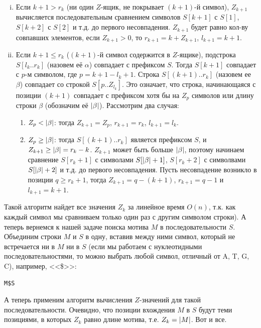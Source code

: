 \documentclass[letterpaper, 11pt]{article}
\DeclarePairedDelimiter{\abs}{\lvert}{\rvert}
\begin{document}
\begin{enumerate}[(i)]
\item
Если $k + 1 > r_k$ (ни один $Z$-ящик, не покрывает $(k+1)$-й символ), $Z_{k+1}$ вычисляется последовательным сравнением символов $S[k+1]$ с $S[1]$, $S[k+2]$ с $S[2]$ и т.д. до первого несовпадения. $Z_{k+1}$ будет равно кол-ву совпавших элементов, если $Z_{k+1} > 0$, то $r_{k+1} = k + Z_{k+1}$, $l_{k+1} = k + 1$.
\item
Если $k + 1 \leq r_k$ ($(k+1)$-й символ содержится в $Z$-ящике), подстрока $S[l_k..r_k]$ (назовем её $\alpha$) совпадает с префиксом $S$. Тогда $S[k+1]$ совпадает с $p$-м символом, где $p = k + 1 - l_k + 1$. Строка $S[(k+1)..r_k]$ (назовем ее $\beta$) совпадает со строкой $S[p..Z_{l_k}]$. Это означает, что строка, начинающаяся с позиции $(k+1)$ совпадает с префиксом хотя бы на $Z_{p}$ символов или длину строки $\beta$ (обозначим её $\abs{\beta}$). Рассмотрим два случая:
\begin{enumerate}
 \item
 $Z_{p} < \abs{\beta}$: тогда $Z_{k+1} = Z_{p}$, $r_{k+1} = r_{k}$, $l_{k+1} = l_k$.
 \item
 $Z_{p} \geq \abs{\beta}$: тогда $S[(k+1)..r_k]$ является префиксом $S$, и $Z_{k+1} \geq \abs{\beta} = r_k - k$. $Z_{k + 1}$ может быть больше $\abs{\beta}$, поэтому начинаем сравнение $S[r_k + 1]$ с символами $S[\abs{\beta} + 1]$, $S[r_k + 2]$ с символвами $S[\abs{\beta} + 2]$ и т.д. до первого несовпадения. Пусть несовпадение возникло в позиции $q \geq r_k + 1$, тогда $Z_{k+1} = q - (k +1)$, $r_{k+1} = q - 1$ и $l_{k+1} = k + 1$.
\end{enumerate}
\end{enumerate}
\par
Такой алгоритм найдет все значения $Z_k$ за линейное время $O(n)$, т.к. как каждый символ мы сравниваем только один раз с другим символом строки). А теперь вернемся к нашей задаче поиска мотива $M$ в последовательности $S$. Объединим строки $M$ и $S$ в одну, вставив между ними символ, который не встречается ни в $M$ ни в $S$ (если мы работаем с нуклеотидными последовательностями, то можно выбрать любой символ, отличный от A, T, G, C), например, <<\$>>:
\begin{verbatim}
M$S
\end{verbatim}
\par
А теперь применим алгоритм вычисления $Z$-значений для такой последовательности. Очевидно, что позиции вхождения $M$ в $S$ будут теми позициями, в которых $Z_k$ равно длине мотива, т.е. $Z_k = \abs{M}$. Вот и все.
\end{document}
